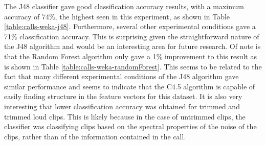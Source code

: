 The J48 classifier gave good classification accuracy results, with a
maximum accuracy of 74\%, the highest seen in this experiment, as
shown in Table \ref{table:calls-weka-j48}.  Furthermore, several other
experimental conditions gave a 71\% classification accuracy.  This is
surprising given the straightforward nature of the J48 algorithm and
would be an interesting area for future research.  Of note is that the
Random Forest algorithm only gave a 1\% improvement to this result as
is shown in Table \ref{table:calls-weka-randomForest}.  This seems to
be related to the fact that many different experimental conditions of
the J48 algorithm gave similar performance and seems to indicate that
the C4.5 algorithm is capable of easily finding structure in the
feature vectors for this dataset.  It is also very interesting that
lower classification accuracy was obtained for trimmed and trimmed
loud clips.  This is likely because in the case of untrimmed clips,
the classifier was classifying clips based on the spectral properties
of the noise of the clips, rather than of the information contained in
the call.

